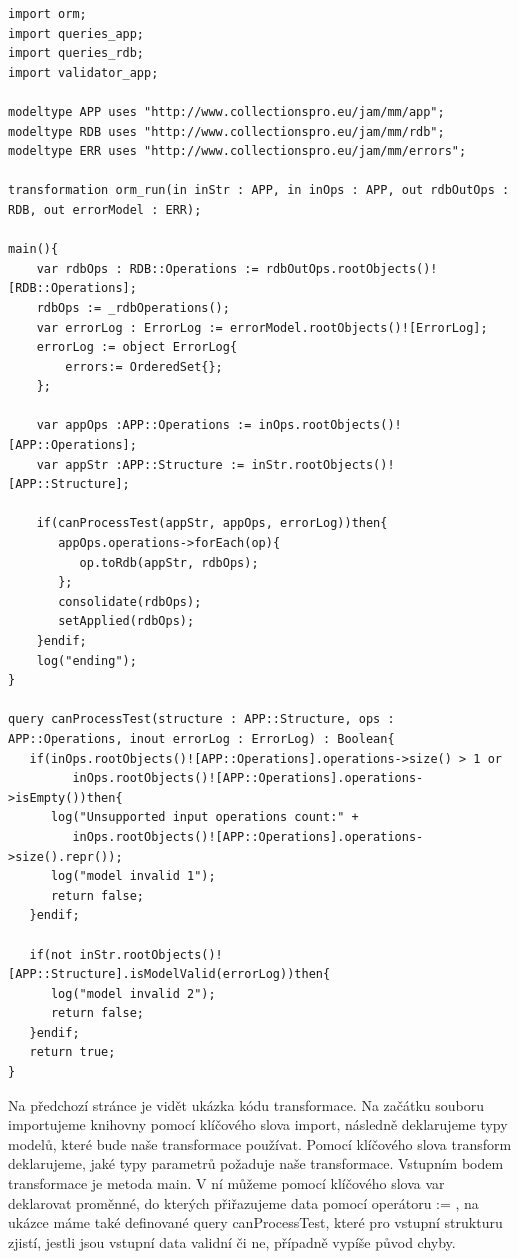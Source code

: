 \documentclass[11pt,twoside,a4paper]{book}
\begin{document}
\begin{verbatim}
import orm;
import queries_app;
import queries_rdb;
import validator_app;
	
modeltype APP uses "http://www.collectionspro.eu/jam/mm/app";
modeltype RDB uses "http://www.collectionspro.eu/jam/mm/rdb";
modeltype ERR uses "http://www.collectionspro.eu/jam/mm/errors";

transformation orm_run(in inStr : APP, in inOps : APP, out rdbOutOps : RDB, out errorModel : ERR);

main(){	
    var rdbOps : RDB::Operations := rdbOutOps.rootObjects()![RDB::Operations];
    rdbOps := _rdbOperations();
    var errorLog : ErrorLog := errorModel.rootObjects()![ErrorLog];
    errorLog := object ErrorLog{ 
        errors:= OrderedSet{};
    };
	
	var appOps :APP::Operations := inOps.rootObjects()![APP::Operations];
	var appStr :APP::Structure := inStr.rootObjects()![APP::Structure];
	
    if(canProcessTest(appStr, appOps, errorLog))then{
       appOps.operations->forEach(op){
          op.toRdb(appStr, rdbOps);
       };
       consolidate(rdbOps);
       setApplied(rdbOps);
    }endif;
    log("ending");
}

query canProcessTest(structure : APP::Structure, ops : APP::Operations, inout errorLog : ErrorLog) : Boolean{
   if(inOps.rootObjects()![APP::Operations].operations->size() > 1 or 
         inOps.rootObjects()![APP::Operations].operations->isEmpty())then{
      log("Unsupported input operations count:" + 
         inOps.rootObjects()![APP::Operations].operations->size().repr());
      log("model invalid 1");
      return false;
   }endif;

   if(not inStr.rootObjects()![APP::Structure].isModelValid(errorLog))then{
      log("model invalid 2");
      return false;
   }endif;
   return true;	
}
\end{verbatim}


Na předchozí stránce je vidět ukázka kódu transformace. Na začátku souboru
importujeme knihovny pomocí klíčového slova import, následně deklarujeme typy
modelů, které bude naše transformace používat. Pomocí klíčového slova transform
deklarujeme, jaké typy parametrů požaduje naše transformace. Vstupním
bodem transformace je metoda main. V ní můžeme pomocí klíčového slova var
deklarovat proměnné, do kterých přiřazujeme data pomocí operátoru := , na ukázce
máme také definované query canProcessTest, které pro vstupní strukturu zjistí,
jestli jsou vstupní data validní či ne, případně vypíše původ chyby.
\end{document}
